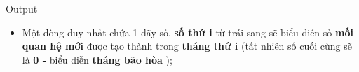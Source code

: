 Output
\begin{itemize}
	\item     Một dòng duy nhất chứa 1 dãy số,    \textbf{      số thứ i}    từ trái sang sẽ biểu diễn số    \textbf{      mối quan hệ mới}    được tạo thành trong    \textbf{      tháng thứ i}    (tất nhiên số cuối cùng sẽ là    \textbf{      0 -}    biểu diễn    \textbf{      tháng bão hòa}    );   
\end{itemize}